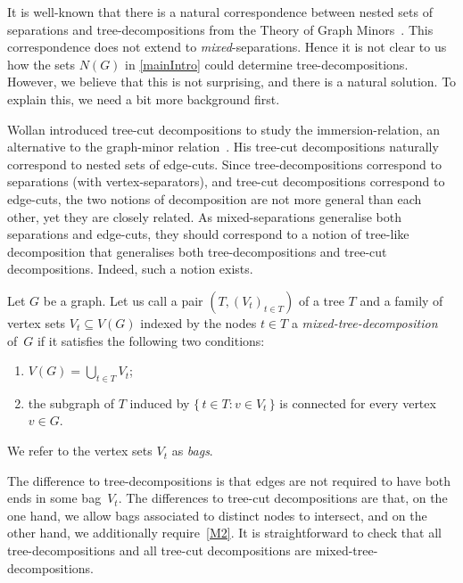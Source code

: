 \documentclass{aic}
\newcommand{\se}{\subseteq}
\theoremstyle{plain}
\theoremstyle{definition}
\theoremstyle{plain}
\theoremstyle{plain}
\begin{document}
It is well-known that there is a natural correspondence between nested sets of separations and tree-decompositions from the Theory of Graph Minors~\cite{GMX}.
This correspondence does not extend to \emph{mixed}-separations.
Hence it is not clear to us how the sets $N(G)$ in \autoref{mainIntro} could determine tree-decompositions.
However, we believe that this is not surprising, and there is a natural solution.
To explain this, we need a bit more background first.

Wollan introduced tree-cut decompositions to study the immersion-relation, an alternative to the graph-minor relation~\cite{WollanExcludedImmersion}.
His tree-cut decompositions naturally correspond to nested sets of edge-cuts.
Since tree-decompositions correspond to separations (with vertex-separators), and tree-cut decompositions correspond to edge-cuts, the two notions of decomposition are not more general than each other, yet they are closely related.
As mixed-separations generalise both separations and edge-cuts, they should correspond to a notion of tree-like decomposition that generalises both tree-decompositions and tree-cut decompositions.
Indeed, such a notion exists.

Let $G$ be a graph.
Let us call a pair $(T,(V_t)_{t\in T})$ of a tree $T$ and a family of vertex sets $V_t\se V(G)$ indexed by the nodes $t\in T$ a \emph{mixed-tree-decomposition} of~$G$ if it satisfies the following two conditions:
\begin{enumerate}[label=\textnormal{(M\arabic*)}]
    \item $V(G)=\bigcup_{t\in T}V_t$;
    \item\label{M2} the subgraph of $T$ induced by $\{\,t\in T:v\in V_t\,\}$ is connected for every vertex $v\in G$.
\end{enumerate}
We refer to the vertex sets $V_t$ as \emph{bags}.

The difference to tree-decompositions is that edges are not required to have both ends in some bag~$V_t$.
The differences to tree-cut decompositions are that, on the one hand, we allow bags associated to distinct nodes to intersect, and on the other hand, we additionally require~\ref{M2}.
It is straightforward to check that all tree-decompositions and all tree-cut decompositions are mixed-tree-decompositions.
\end{document}
